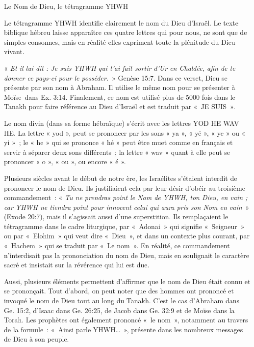 \begin{center}{\LARGE Le Nom de Dieu, le tétragramme YHWH}\end{center}
\begin{small}

Le tétragramme YHWH identifie clairement le nom du Dieu d'Israël. Le texte biblique hébreu laisse apparaître ces quatre lettres qui pour nous, ne sont que de simples consonnes, mais en réalité elles expriment toute la plénitude du Dieu vivant.\bigskip

« \emph{Et il lui dit : Je suis YHWH qui t'ai fait sortir d'Ur en Chaldée, afin de te donner ce pays-ci pour le posséder.} » Genèse 15:7.
Dans ce verset, Dieu se présente par son nom à Abraham. Il utilise le même nom pour se présenter à Moïse dans Ex. 3:14. Finalement, ce nom est utilisé plus de 5000 fois dans le Tanakh pour faire référence au Dieu d'Israël et est traduit par « JE SUIS ».\bigskip

Le nom divin (dans sa forme hébraïque) s'écrit avec les lettres YOD HE WAV HE.\newline
La lettre « yod », peut se prononcer par les sons « ya », « yé », « ye » ou « yi » ; le « he » qui se prononce « hé » peut être muet comme en français et servir à séparer deux sons différents ; la lettre « wav » quant à elle peut se prononcer  « o », « ou », ou encore « é ».\bigskip

Plusieurs siècles avant le début de notre ère, les Israélites s'étaient interdit de prononcer le nom de Dieu. Ils justifiaient cela par leur désir d'obéir au troisième commandement : « \emph{Tu ne prendras point le Nom de YHWH, ton Dieu, en vain ; car YHWH ne tiendra point pour innocent celui qui aura pris son Nom en vain} » (Exode 20:7), mais il s'agissait aussi d'une superstition.\newline
Ils remplaçaient le tétragramme dans le cadre liturgique, par « Adonai » qui signifie « Seigneur » ou par « Elohim » qui veut dire « Dieu », et dans un contexte plus courant, par « Hachem » qui se traduit par « Le nom ». En réalité, ce commandement n'interdisait pas la prononciation du nom de Dieu, mais en soulignait le caractère sacré et insistait sur la révérence qui lui est due.\bigskip

Aussi, plusieurs éléments permettent d'affirmer que le nom de Dieu était connu et se prononçait.\newline
Tout d'abord, on peut noter que des hommes ont prononcé et invoqué le nom de Dieu tout au long du Tanakh. C'est le cas d'Abraham dans Ge. 15:2, d'Isaac dans Ge. 26:25, de Jacob dans Ge. 32:9 et de Moïse dans la Torah. Les prophètes ont également prononcé « le nom », notamment au travers de la formule : « Ainsi parle YHWH… », présente dans les nombreux messages de Dieu à son peuple.\bigskip


\end{small}
